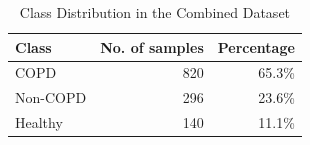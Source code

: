 \begin{table}[htbp]
    \centering
    \caption{Class Distribution in the Combined Dataset}
    \label{tab:class_dist}
    \small %
    \renewcommand{\arraystretch}{1.2} %
    \begin{tabular}{lrr} 
        \toprule
        \textbf{Class} & \textbf{No. of samples} & \textbf{Percentage} \\
        \midrule
        COPD & 820 & 65.3\% \\
        Non-COPD & 296 & 23.6\% \\
        Healthy & 140 & 11.1\% \\
        \bottomrule
    \end{tabular}
\end{table}